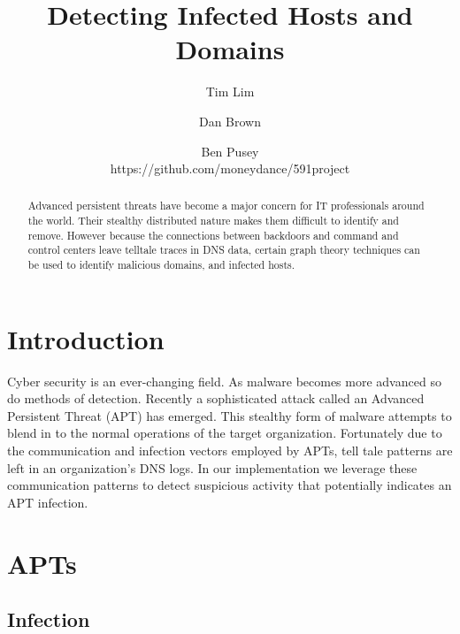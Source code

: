 \documentclass{article} %
\title{Detecting Infected Hosts and Domains}
\author{
Tim  Lim\\
\and
Dan Brown \\
\and
Ben Pusey \\
\AND
https://github.com/moneydance/591project
}
\begin{document}
\maketitle


\begin{abstract}
Advanced persistent threats have become a major concern for IT professionals around the world. Their stealthy distributed nature makes them difficult 
to identify and remove. However because the connections between backdoors and command and control centers leave telltale traces in DNS data, certain graph theory
techniques can be used to identify malicious domains, and infected hosts.
\end{abstract}

\section{Introduction}
Cyber security is an ever-changing field. As malware becomes more advanced so do methods of detection. Recently a sophisticated attack called an Advanced Persistent Threat (APT) has emerged. This stealthy form of malware attempts to blend in to the normal operations of the target organization. Fortunately due to the communication and infection vectors employed by APTs,  tell tale patterns are left in an organization's DNS logs. In our implementation we leverage these communication patterns to detect suspicious activity that potentially indicates an APT infection.





\section{APTs}

\subsection{Infection}
\end{document}
